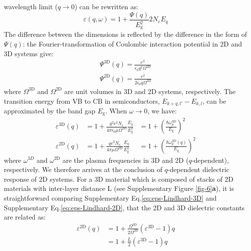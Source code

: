 \documentclass[journal=ancac3,manuscript=article,email=true,hyperref=true,keywords=true]{achemso}
\begin{document}
wavelength limit (\(q \to 0\)) can be rewritten as:
%
\begin{equation}
\label{eq:Lindhard-derived}
\varepsilon(q, \omega) = 1 + \frac{\Psi(q)}{E_{\mathrm{g}}^{2}}{}2 N_{e} E_{q}
\end{equation}
%
The difference between the dimensions is reflected by the difference
in the form of \(\Psi(q)\): the Fourier-transformation of Coulombic
interaction potential in 2D and 3D systems give:
%
\begin{eqnarray}
\label{eq:Psi-2D-3D}
\Psi^{\mathrm{3D}}(q) = \frac{e^2}{\epsilon_{0} q^{2} \Omega^{\mathrm{3D}}}  \\ 
\Psi^{\mathrm{2D}}(q) = \frac{e^2}{2\epsilon_{0} q \Omega^{\mathrm{2D}}}
\end{eqnarray}
%
where \(\Omega^{\mathrm{3D}}\) and \(\Omega^{\mathrm{2D}}\) are unit
volumes in 3D and 2D systems, respectively. The transition energy from
VB to CB in semiconductors, \(E_{k+q, l'}-E_{k, l}\), can be
approximated by the band gap \(E_{\mathrm{g}}\). When \(\omega \to 0\), we
have:
%
\begin{eqnarray}
\label{eq:eps-Lindhard-3D}
\varepsilon^{\mathrm{3D}}(q) &= 1 + \displaystyle \frac{q^{2} e^{2} N_{e}}{4 \pi \epsilon_0 \mu \Omega^{\mathrm{3D}}} \frac{E_{q}}{E_{\mathrm{g}}^{2}}
                          &= 1 + (\displaystyle \frac{\hbar \omega^{\mathrm{3D}}_{p}}{E_{\mathrm{g}}})^{2} \\
\label{eq:eps-Lindhard-2D}
\varepsilon^{\mathrm{2D}}(q) &= 1 + \displaystyle \frac{q e^{2} N_{e}}{4 \pi \mu \Omega^{\mathrm{2D}}} \frac{E_{q}}{E_{\mathrm{g}}^{2}}&= 1 + (\displaystyle \frac{\hbar \omega^{\mathrm{2D}}_{p}(q)}{E_{\mathrm{g}}})^{2} 
\end{eqnarray}
%
where \(\omega^{3D}\) and \(\omega^{\mathrm{2D}}\) are the plasma
frequencies in 3D and 2D (\(q\)-dependent), respectively.  We therefore
arrives at the conclusion of \(q\)-dependent dielectric response of 2D
systems. For a 3D material 
which is composed of stacks of 2D materials with inter-layer 
distance L (see Supplementary Figure \ref{fig-6}{\bf a}), it is 
straightforward comparing Supplementary Eq.\ref{eq:eps-Lindhard-3D} and
Supplementary Eq.\ref{eq:eps-Lindhard-2D}, that the 2D and 3D dielectric constants are related as:
%
%
\begin{equation}
\label{eq:relation-2D-3D}
\begin{aligned}
\varepsilon^{\mathrm{2D}}(q) &= 1 + \frac{\Omega^{\mathrm{3D}}}{2 \Omega^{\mathrm{2D}}} (\varepsilon^{\mathrm{3D}} - 1)q \\
                          &= 1 + \frac{L}{2}(\varepsilon^{\mathrm{3D}} - 1)q
\end{aligned}
\end{equation}
\end{document}
